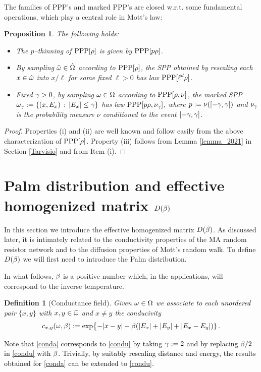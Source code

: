 \documentclass[12pt,a4paper,reqno]{amsart}
\newtheorem{Proposition}[Theorem]{Proposition}
\newtheorem{Definition}[Theorem]{Definition}
\let\O=\Omega \let\P=\Pi   \let\Ps=\Psi \let\Si=\Sigma \let\X=\Xi
\newcommand{\rosso}{\textcolor{black}} %
\newcommand{\club}{$\clubsuit$}
\begin{document}
The families of PPP's and marked PPP's are closed w.r.t. some fundamental operations, which play a central role in Mott's law:
\begin{Proposition}\label{cotechino}
The following holds:
\begin{itemize}
\item[(i)] The $p$--thinning of 
  ${\rm PPP}[\rho]$ is  given by 
${\rm PPP}[p \rho]$. 
\item[(ii)] By sampling $\hat\o\in \hat\O$ according to  ${\rm PPP}[\rho]$, the SPP obtained by rescaling each $x\in \hat {\omega} $ into $x/\ell$ for some fixed $\ell>0$ has law ${\rm PPP}[\ell^d \rho]$.
\item[(iii)] Fixed $\gamma>0$, by sampling $\o\in \O$ according to  ${\rm PPP}[\rho,\nu]$,    the marked SPP $\omega_\gamma:=\{(x,E_x)\,:\, |E_x|\leq \gamma \}$ has  law ${\rm PPP}[ p  \rho,\nu_\gamma]$, where $p:=\nu([-\gamma, \gamma])$ and $\nu_\gamma$ is the probability measure $\nu$ conditioned to the event $[-\gamma,\gamma]$.
    \end{itemize}
\end{Proposition}
\begin{proof} Properties (i) and (ii) are well known and follow easily from  the above characterization of ${\rm PPP}[\rho]$.
 Property (iii) follows from Lemma \ref{lemma_2021} in Section \ref{Tarvisio} and from Item (i).
\end{proof}
%
%
%
%
\section{Palm distribution and effective homogenized matrix $D(\beta)$}\label{palmato}
In this section we introduce the effective homogenized matrix $D(\beta)$. As discussed later,  it is  intimately  related to the conductivity properties of the MA random resistor network and to the diffusion properties of Mott's random walk. To define $D(\beta)$ we  will  first need to introduce the Palm distribution.


In what follows, $\beta$ is a positive number which, in the applications,  will correspond to the inverse temperature.
\begin{Definition}[Conductance field]
Given $\o\in \O$ we associate to each  \rosso{unordered} pair $\{x,y\}$ with $x,y\in \widehat{\omega}$ and $x\not=y$ the conducivity 
\begin{equation}\label{conda}
c_{x,y}(\omega,\beta):=\exp\bigl\{ -  |x-y| -\beta  ( |E_x|+ |E_y|+ |E_x-E_y|) \}\,.
\end{equation}
\end{Definition}
\rosso{Note that \eqref{conda} corresponds to \eqref{condu} by taking $\gamma:=2$ and by replacing $\beta/2$ in \eqref{condu}  with $\beta$. Trivially, by suitably rescaling distance and energy, the results obtained for \eqref{conda} can be extended to \eqref{condu}.}
\end{document}
